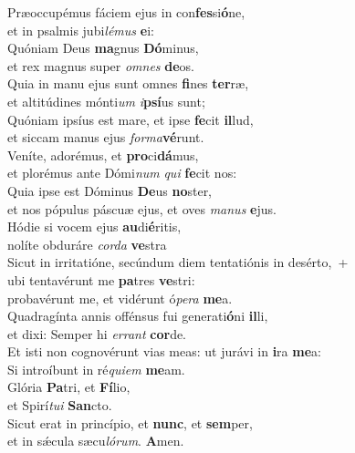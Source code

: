 \evenverse Præoccupémus fáciem ejus in con\textbf{fes}si\textbf{ó}ne,~\*\\
\evenverse et in psalmis jubi\textit{lé}\textit{mus} \textbf{e}i:\\
\oddverse Quóniam Deus \textbf{ma}gnus \textbf{Dó}minus,~\*\\
\oddverse et rex magnus super \textit{om}\textit{nes} \textbf{de}os.\\
\evenverse Quia in manu ejus sunt omnes \textbf{fi}nes \textbf{ter}ræ,~\*\\
\evenverse et altitúdines mónti\textit{um} \textit{i}\textbf{psí}us sunt;\\
\oddverse Quóniam ipsíus est mare, et ipse \textbf{fe}cit \textbf{il}lud,~\*\\
\oddverse et siccam manus ejus \textit{for}\textit{ma}\textbf{vé}runt.\\
\evenverse Veníte, adorémus, et \textbf{pro}ci\textbf{dá}mus,~\*\\
\evenverse et plorémus ante Dómi\textit{num} \textit{qui} \textbf{fe}cit nos:\\
\oddverse Quia ipse est Dóminus \textbf{De}us \textbf{no}ster,~\*\\
\oddverse et nos pópulus páscuæ ejus, et oves \textit{ma}\textit{nus} \textbf{e}jus.\\
\evenverse Hódie si vocem ejus \textbf{au}di\textbf{é}ritis,~\*\\
\evenverse nolíte obduráre \textit{cor}\textit{da} \textbf{ve}stra\\
\oddverse Sicut in irritatióne, secúndum diem tentatiónis in desérto,~+\\
\oddverse  ubi tentavérunt me \textbf{pa}tres \textbf{ve}stri:~\*\\
\oddverse probavérunt me, et vidérunt ó\textit{pe}\textit{ra} \textbf{me}a.\\
\evenverse Quadragínta annis offénsus fui generati\textbf{ó}ni \textbf{il}li,~\*\\
\evenverse et dixi: Semper hi \textit{er}\textit{rant} \textbf{cor}de.\\
\oddverse Et isti non cognovérunt vias meas: ut jurávi in \textbf{i}ra \textbf{me}a:~\*\\
\oddverse Si introíbunt in ré\textit{qui}\textit{em} \textbf{me}am.\\
\evenverse Glória \textbf{Pa}tri, et \textbf{Fí}lio,~\*\\
\evenverse et Spirí\textit{tu}\textit{i} \textbf{San}cto.\\
\oddverse Sicut erat in princípio, et \textbf{nunc}, et \textbf{sem}per,~\*\\
\oddverse et in sǽcula sæcu\textit{ló}\textit{rum}. \textbf{A}men.\\
